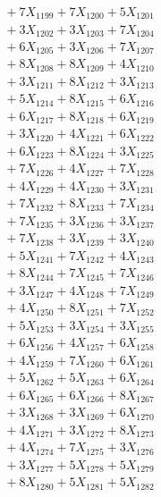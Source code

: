 \documentclass[a4paper,10pt]{article}
\begin{document}
{\begin{align}
&\;  + 7 X_{1199} + 7 X_{1200} + 5 X_{1201} \\[0.3ex]
&\;  + 3 X_{1202} + 3 X_{1203} + 7 X_{1204} \\[0.3ex]
&\;  + 6 X_{1205} + 3 X_{1206} + 7 X_{1207} \\[0.3ex]
&\;  + 8 X_{1208} + 8 X_{1209} + 4 X_{1210} \\[0.5ex]\allowbreak
&\;  + 3 X_{1211} + 8 X_{1212} + 3 X_{1213} \\[0.3ex]
&\;  + 5 X_{1214} + 8 X_{1215} + 6 X_{1216} \\[0.3ex]
&\;  + 6 X_{1217} + 8 X_{1218} + 6 X_{1219} \\[0.3ex]
&\;  + 3 X_{1220} + 4 X_{1221} + 6 X_{1222} \\[0.3ex]
&\;  + 6 X_{1223} + 8 X_{1224} + 3 X_{1225} \\[0.3ex]
&\;  + 7 X_{1226} + 4 X_{1227} + 7 X_{1228} \\[0.3ex]
&\;  + 4 X_{1229} + 4 X_{1230} + 3 X_{1231} \\[0.3ex]
&\;  + 7 X_{1232} + 8 X_{1233} + 7 X_{1234} \\[0.3ex]
&\;  + 7 X_{1235} + 3 X_{1236} + 3 X_{1237} \\[0.3ex]
&\;  + 7 X_{1238} + 3 X_{1239} + 3 X_{1240} \\[0.5ex]\allowbreak
&\;  + 5 X_{1241} + 7 X_{1242} + 4 X_{1243} \\[0.3ex]
&\;  + 8 X_{1244} + 7 X_{1245} + 7 X_{1246} \\[0.3ex]
&\;  + 3 X_{1247} + 4 X_{1248} + 7 X_{1249} \\[0.3ex]
&\;  + 4 X_{1250} + 8 X_{1251} + 7 X_{1252} \\[0.3ex]
&\;  + 5 X_{1253} + 3 X_{1254} + 3 X_{1255} \\[0.3ex]
&\;  + 6 X_{1256} + 4 X_{1257} + 6 X_{1258} \\[0.3ex]
&\;  + 4 X_{1259} + 7 X_{1260} + 6 X_{1261} \\[0.3ex]
&\;  + 5 X_{1262} + 5 X_{1263} + 6 X_{1264} \\[0.3ex]
&\;  + 6 X_{1265} + 6 X_{1266} + 8 X_{1267} \\[0.3ex]
&\;  + 3 X_{1268} + 3 X_{1269} + 6 X_{1270} \\[0.5ex]\allowbreak
&\;  + 4 X_{1271} + 3 X_{1272} + 8 X_{1273} \\[0.3ex]
&\;  + 4 X_{1274} + 7 X_{1275} + 3 X_{1276} \\[0.3ex]
&\;  + 3 X_{1277} + 5 X_{1278} + 5 X_{1279} \\[0.3ex]
&\;  + 8 X_{1280} + 5 X_{1281} + 5 X_{1282} \\[0.3ex]

\end{align}}
\end{document}
